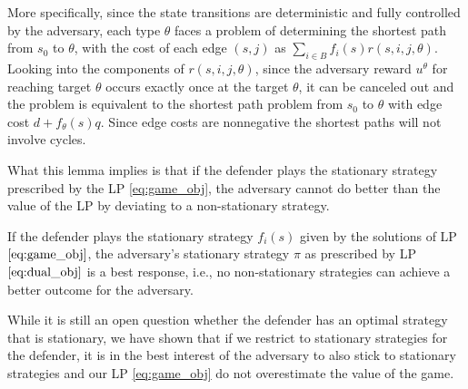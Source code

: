 More specifically,
since the state transitions are deterministic and fully controlled by the adversary,
each type $\theta$ faces a problem of determining the shortest path from $s_0$ to $\theta$, 
with the cost of each edge $(s,j)$ as
$\sum_{i\in B}f_i(s) r(s,i,j,\theta)$.
Looking into the components of $r(s,i,j,\theta)$, since the adversary reward $u^\theta$ for reaching target $\theta$ occurs exactly once at the target $\theta$,
it can be canceled out and the problem is equivalent to the shortest path problem from $s_0$ to $\theta$ with
edge cost $d+f_\theta(s) q$. Since edge costs are nonnegative the shortest paths will not involve cycles.

What this lemma implies is that if the defender plays the stationary strategy prescribed by the LP \eqref{eq:game_obj}, the adversary cannot 
do better than the value of the LP by deviating to a non-stationary strategy.
\begin{corollary}
If the defender plays the stationary strategy $f_i(s)$
given by the solutions of LP $\eqref{eq:game_obj}$,
the adversary's stationary strategy $\pi$ as prescribed by
LP $\eqref{eq:dual_obj}$ is a best response, i.e., no
non-stationary strategies can achieve a better outcome for the adversary.
\end{corollary}

While it is still an open question whether the defender has an optimal strategy that is stationary,
we have shown that if we restrict to  stationary strategies for the defender, it is in the best interest of the adversary to also stick to stationary strategies and our LP \eqref{eq:game_obj} do not overestimate the value of the game. 

